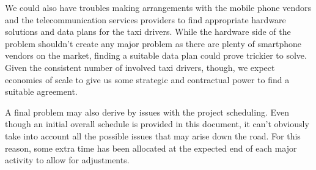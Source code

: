 We could also have troubles making arrangements with the mobile phone vendors and the telecommunication services providers to find appropriate hardware solutions and data plans for the taxi drivers. While the hardware side of the problem shouldn't create any major problem as there are plenty of smartphone vendors on the market, finding a suitable data plan could prove trickier to solve. Given the consistent number of involved taxi drivers, though, we expect economies of scale to give us some strategic and contractual power to find a suitable agreement. 

A final problem may also derive by issues with the project scheduling. Even though an initial overall schedule is provided in this document, it can't obviously take into account all the possible issues that may arise down the road. For this reason, some extra time has been allocated at the expected end of each major activity to allow for adjustments.